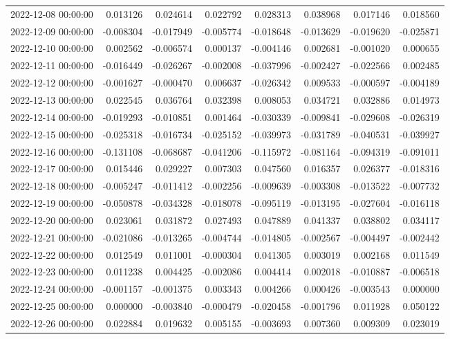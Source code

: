 \begin{tabular}{lrrrrrrr}
2022-12-08 00:00:00 & 0.013126 & 0.024614 & 0.022792 & 0.028313 & 0.038968 & 0.017146 & 0.018560 \\
2022-12-09 00:00:00 & -0.008304 & -0.017949 & -0.005774 & -0.018648 & -0.013629 & -0.019620 & -0.025871 \\
2022-12-10 00:00:00 & 0.002562 & -0.006574 & 0.000137 & -0.004146 & 0.002681 & -0.001020 & 0.000655 \\
2022-12-11 00:00:00 & -0.016449 & -0.026267 & -0.002008 & -0.037996 & -0.002427 & -0.022566 & 0.002485 \\
2022-12-12 00:00:00 & -0.001627 & -0.000470 & 0.006637 & -0.026342 & 0.009533 & -0.000597 & -0.004189 \\
2022-12-13 00:00:00 & 0.022545 & 0.036764 & 0.032398 & 0.008053 & 0.034721 & 0.032886 & 0.014973 \\
2022-12-14 00:00:00 & -0.019293 & -0.010851 & 0.001464 & -0.030339 & -0.009841 & -0.029608 & -0.026319 \\
2022-12-15 00:00:00 & -0.025318 & -0.016734 & -0.025152 & -0.039973 & -0.031789 & -0.040531 & -0.039927 \\
2022-12-16 00:00:00 & -0.131108 & -0.068687 & -0.041206 & -0.115972 & -0.081164 & -0.094319 & -0.091011 \\
2022-12-17 00:00:00 & 0.015446 & 0.029227 & 0.007303 & 0.047560 & 0.016357 & 0.026377 & -0.018316 \\
2022-12-18 00:00:00 & -0.005247 & -0.011412 & -0.002256 & -0.009639 & -0.003308 & -0.013522 & -0.007732 \\
2022-12-19 00:00:00 & -0.050878 & -0.034328 & -0.018078 & -0.095119 & -0.013195 & -0.027604 & -0.016118 \\
2022-12-20 00:00:00 & 0.023061 & 0.031872 & 0.027493 & 0.047889 & 0.041337 & 0.038802 & 0.034117 \\
2022-12-21 00:00:00 & -0.021086 & -0.013265 & -0.004744 & -0.014805 & -0.002567 & -0.004497 & -0.002442 \\
2022-12-22 00:00:00 & 0.012549 & 0.011001 & -0.000304 & 0.041305 & 0.003019 & 0.002168 & 0.011549 \\
2022-12-23 00:00:00 & 0.011238 & 0.004425 & -0.002086 & 0.004414 & 0.002018 & -0.010887 & -0.006518 \\
2022-12-24 00:00:00 & -0.001157 & -0.001375 & 0.003343 & 0.004266 & 0.000426 & -0.003543 & 0.000000 \\
2022-12-25 00:00:00 & 0.000000 & -0.003840 & -0.000479 & -0.020458 & -0.001796 & 0.011928 & 0.050122 \\
2022-12-26 00:00:00 & 0.022884 & 0.019632 & 0.005155 & -0.003693 & 0.007360 & 0.009309 & 0.023019 \\

\end{tabular}

